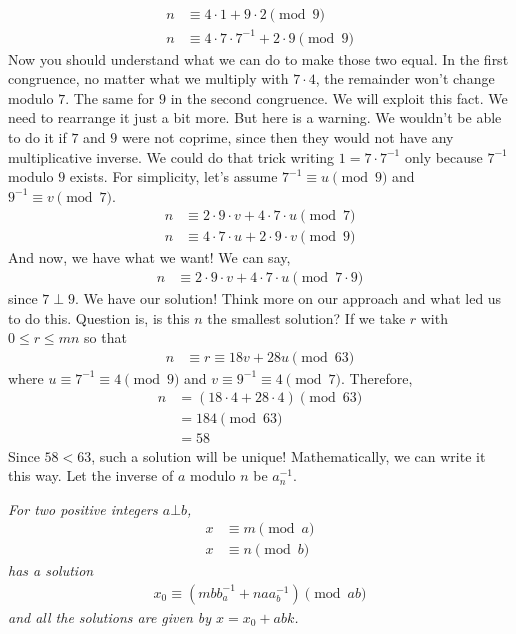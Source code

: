 \documentclass{subfile}
\begin{document}
		\begin{align*}
			n & \equiv4\cdot1+9\cdot2\pmod{9}\\
			n & \equiv4\cdot7\cdot7^{-1}+2\cdot9\pmod{9}
		\end{align*}
	Now you should understand what we can do to make those two equal. In the first congruence, no matter what we multiply with $7\cdot4$, the remainder won't change modulo $7$. The same for $9$ in the second congruence. We will exploit this fact. We need to rearrange it just a bit more. But here is a warning. We wouldn't be able to do it if $7$ and $9$ were not coprime, since then they would not have any multiplicative inverse. We could do that trick writing $1=7\cdot7^{-1}$ only because $7^{-1}$ modulo $9$ exists. For simplicity, let's assume $7^{-1}\equiv u\pmod{9}$ and $9^{-1}\equiv v\pmod{7}$.
		\begin{align*}
			n & \equiv2\cdot9\cdot v+4\cdot7\cdot u\pmod{7}\\
			n & \equiv4\cdot7\cdot u+2\cdot9\cdot v\pmod{9}
		\end{align*}
	And now, we have what we want! We can say,
		\begin{align*}
			n & \equiv2\cdot9\cdot v+4\cdot7\cdot u\pmod{7\cdot9}
		\end{align*}
	since $7 \perp 9$. We have our solution! Think more on our approach and what led us to do this. Question is, is this $n$ the smallest solution? If we take $r$ with $0\leq r\leq mn$ so that
		\begin{align*}
			n & \equiv r\equiv18v+28u\pmod{63}
		\end{align*}
	where $u\equiv7^{-1}\equiv4\pmod9$ and $v\equiv9^{-1}\equiv4\pmod 7$. Therefore,
		\begin{align*}
			n
				& = (18\cdot4+28\cdot4)\pmod{63}\\
				& =184\pmod{63}\\
				& =58
		\end{align*}
	Since $58<63$, such a solution will be unique! Mathematically, we can write it this way. Let the inverse of $a$ modulo $n$ be $a^{-1}_n$.
		\begin{theorem}\slshape
			For two positive integers $a\bot b$,
				\begin{align*}
					x & \equiv m\pmod a\\
					x & \equiv n\pmod b
				\end{align*}
			has a solution
				\begin{align*}
					x_0 \equiv (mbb^{-1}_a+naa^{-1}_b)\pmod{ab}
				\end{align*}
			and all the solutions are given by $x=x_0+abk$.
		\end{theorem}
\end{document}
